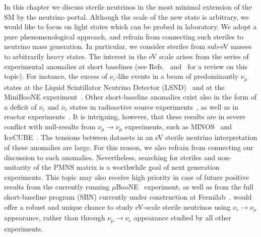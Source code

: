 In this chapter we discuss sterile neutrinos in the most minimal extension of the SM by the neutrino portal. Although the scale of the new state is arbitrary, we would like to focus on light states which can be probed in laboratory. We adopt a pure phenomenological approach, and refrain from connecting such steriles to neutrino mass generation. In particular, we consider steriles from sub-eV masses to arbitrarily heavy states. The interest in the eV scale arises from the series of experimental anomalies at short baselines (see Refs.~\cite{Diaz:2019fwt} and~\cite{Dentler:2018sju} for a review on this topic). For instance, the excess of $\nu_e$-like events in a beam of predominantly $\nu_\mu$ states at the Liquid Scintillator Neutrino Detector (LSND)~\cite{Aguilar:2001ty} and at the MiniBooNE experiment~\cite{Aguilar-Arevalo:2018gpe}. Other short-baseline anomalies exist also in the form of a deficit of $\nu_e$ and $\overline{\nu}_e$ states in radioactive source experiments~\cite{Hampel:1997fc,Abdurashitov:2005tb}, as well as in reactor experiments~\cite{Mention:2011rk}. It is intriguing, however, that these results are in severe conflict with null-results from $\nu_\mu \to \nu_\mu$ experiments, such as MINOS~\cite{Adamson:2017uda} and IceCUBE~\cite{TheIceCubeCollaboration2016}. The tensions between datasets in an eV sterile neutrino interpretation of these anomalies are large. For this reason, we also refrain from connecting our discussion to such anomalies. Nevertheless, searching for steriles and non-unitarity of the PMNS matrix is a worthwhile goal of next generation experiments. This topic may also receive high priority in case of future positive results from the currently running $\mu$BooNE~\cite{Adams:2019iqc} experiment, as well as from the full short-baseline program (SBN) currently under construction at Fermilab~\cite{Cianci2017}. \nus would offer a robust and unique chance to study eV-scale sterile neutrinos using $\nu_e \to \nu_\mu$ appearance, rather than through $\nu_\mu \to \nu_e$ appearance studied by all other experiments.


